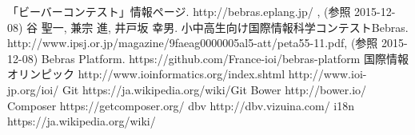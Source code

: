 \documentclass[a4paper]{jarticle}
\begin{document}
\begin{thebibliography}{1}

 「ビーバーコンテスト」情報ページ.  http://bebras.eplang.jp/ , (参照 2015-12-08)
 谷 聖一, 兼宗 進, 井戸坂 幸男. 小中高生向け国際情報科学コンテストBebras.  http://www.ipsj.or.jp/magazine/9faeag0000005al5-att/peta55-11.pdf, (参照 2015-12-08)
 Bebras Platform. https://github.com/France-ioi/bebras-platform
 国際情報オリンピック http://www.ioinformatics.org/index.shtml   http://www.ioi-jp.org/ioi/
 Git  https://ja.wikipedia.org/wiki/Git
Bower  http://bower.io/
Composer  https://getcomposer.org/
dbv  http://dbv.vizuina.com/
i18n  https://ja.wikipedia.org/wiki/%



\end{thebibliography}
\end{document}
